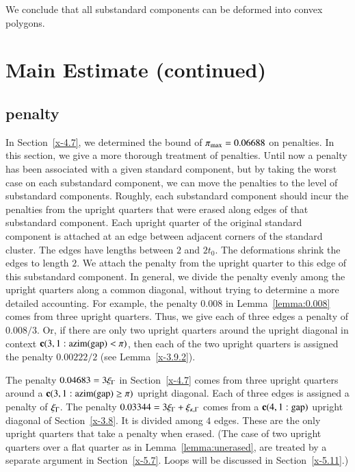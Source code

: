 We conclude that all substandard components can be deformed into convex polygons.





\section{Main Estimate (continued)}%




\subsection{penalty} %
    \label{sec:penalty1}

In Section~\ref{x-4.7}, we determined the bound of
$\pi_{\max}=0.06688$ on penalties. In this section, we give a more
thorough treatment of penalties. Until now a penalty has been
associated with a given standard component, but by taking the worst
case on each substandard component, we can move the penalties to the level of
substandard components.   Roughly, each substandard component should incur the penalties
from the upright quarters that were erased along edges of that
substandard component.  Each upright quarter of the original standard component
is attached at an edge between adjacent corners of the standard
cluster. The edges have lengths between $2$ and $2t_0$.  The
deformations shrink the edges to length $2$.  We attach the
penalty from the upright quarter to this edge of this substandard component.
In general, we divide the penalty evenly among the upright
quarters along a common diagonal, without trying to determine a
more detailed accounting. For example, the penalty $0.008$ in
Lemma~\ref{lemma:0.008} comes from three upright quarters.  Thus,
we give each of three edges a penalty of $0.008/3$. Or, if there
are only two upright quarters around the  upright
diagonal in context ${\operatorname{\bf c}}{(3,1: {\operatorname{azim}}({\operatorname{gap}}) <\pi)}$, 
then each of the two upright quarters is assigned the
penalty $0.00222/2$ (see Lemma~\ref{x-3.9.2}).

The penalty $0.04683 = 3\xi_\Gamma$ in Section~\ref{x-4.7} comes from
three upright quarters around a ${\operatorname{\bf c}}{(3,1: {\operatorname{azim}}({\operatorname{gap}}) \ge \pi)}$ upright diagonal. Each
of three edges is assigned a penalty of $\xi_\Gamma$.  The penalty
$0.03344=3\xi_\Gamma+\xi_{\kappa,\Gamma}$ comes from a ${\operatorname{\bf c}}{(4,1:{\operatorname{gap}})}$ upright diagonal of
Section~\ref{x-3.8}. It is divided among $4$ edges. These are the
only upright quarters that take a penalty when erased. (The case
of two upright quarters over a flat quarter as in
Lemma~\ref{lemma:unerased}, are treated by a separate argument in
Section~\ref{x-5.7}. Loops will be discussed in
Section~\ref{x-5.11}.)

